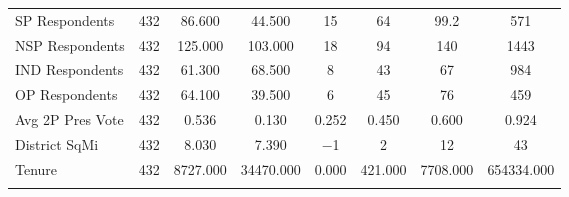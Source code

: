 \begin{sidewaystable}[!htbp]
\begin{tabular}{@{\extracolsep{5pt}}lccccccc}
SP Respondents & 432 & 86.600 & 44.500 & 15 & 64 & 99.2 & 571 \\ 
NSP Respondents & 432 & 125.000 & 103.000 & 18 & 94 & 140 & 1443 \\ 
IND Respondents & 432 & 61.300 & 68.500 & 8 & 43 & 67 & 984 \\ 
OP Respondents & 432 & 64.100 & 39.500 & 6 & 45 & 76 & 459 \\ 
Avg 2P Pres Vote & 432 & 0.536 & 0.130 & 0.252 & 0.450 & 0.600 & 0.924 \\ 
District SqMi & 432 & 8.030 & 7.390 & $-$1 & 2 & 12 & 43 \\ 
Tenure & 432 & 8727.000 & 34470.000 & 0.000 & 421.000 & 7708.000 & 654334.000 \\ 
\hline \\[-1.8ex] 
\end{tabular} 
\end{sidewaystable} 
